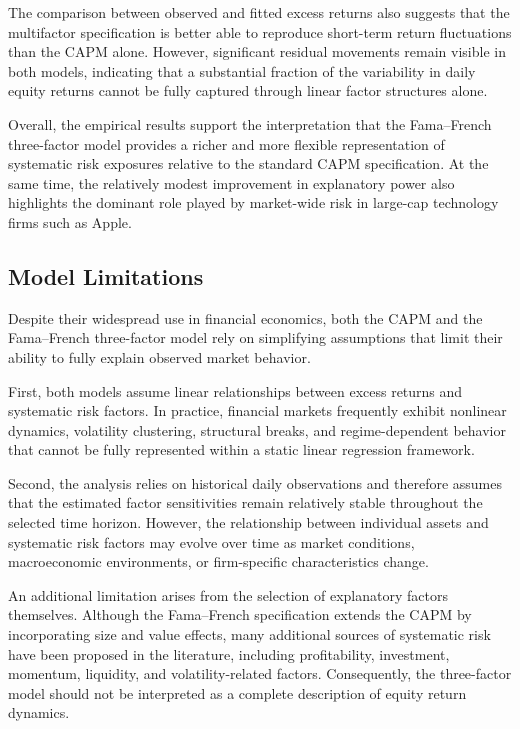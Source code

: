 \documentclass[
  12pt,
  letterpaper,
]{book}
\begin{document}
The comparison between observed and fitted excess returns also suggests
that the multifactor specification is better able to reproduce
short-term return fluctuations than the CAPM alone. However, significant
residual movements remain visible in both models, indicating that a
substantial fraction of the variability in daily equity returns cannot
be fully captured through linear factor structures alone.

Overall, the empirical results support the interpretation that the
Fama--French three-factor model provides a richer and more flexible
representation of systematic risk exposures relative to the standard
CAPM specification. At the same time, the relatively modest improvement
in explanatory power also highlights the dominant role played by
market-wide risk in large-cap technology firms such as Apple.

\subsection{Model Limitations}\label{model-limitations}

Despite their widespread use in financial economics, both the CAPM and
the Fama--French three-factor model rely on simplifying assumptions that
limit their ability to fully explain observed market behavior.

First, both models assume linear relationships between excess returns
and systematic risk factors. In practice, financial markets frequently
exhibit nonlinear dynamics, volatility clustering, structural breaks,
and regime-dependent behavior that cannot be fully represented within a
static linear regression framework.

Second, the analysis relies on historical daily observations and
therefore assumes that the estimated factor sensitivities remain
relatively stable throughout the selected time horizon. However, the
relationship between individual assets and systematic risk factors may
evolve over time as market conditions, macroeconomic environments, or
firm-specific characteristics change.

An additional limitation arises from the selection of explanatory
factors themselves. Although the Fama--French specification extends the
CAPM by incorporating size and value effects, many additional sources of
systematic risk have been proposed in the literature, including
profitability, investment, momentum, liquidity, and volatility-related
factors. Consequently, the three-factor model should not be interpreted
as a complete description of equity return dynamics.
\end{document}
